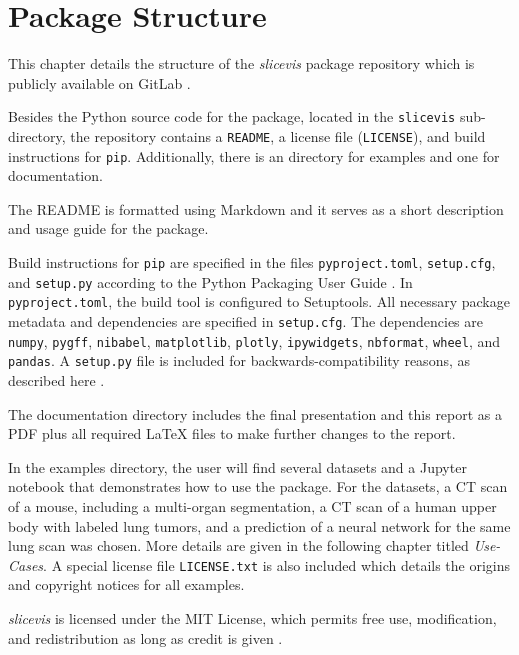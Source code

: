 \chapter{Package Structure}
This chapter details the structure of the \emph{slicevis} package repository which is publicly available on GitLab \cite{repo}.

Besides the Python source code for the package, located in the \texttt{slicevis} sub-directory, the repository contains a \texttt{README}, a license file (\texttt{LICENSE}), and build instructions for \texttt{pip}. Additionally, there is an directory for examples and one for documentation. 

The README is formatted using Markdown and it serves as a short description and usage guide for the package. 

Build instructions for \texttt{pip} are specified in the files \texttt{pyproject.toml}, \texttt{setup.cfg}, and \texttt{setup.py} according to the Python Packaging User Guide \cite{pypa}. In \texttt{pyproject.toml}, the build tool is configured to Setuptools. All necessary package metadata and dependencies are specified in \texttt{setup.cfg}. The dependencies are \texttt{numpy}, \texttt{pygff}, \texttt{nibabel}, \texttt{matplotlib}, \texttt{plotly}, \texttt{ipywidgets}, \texttt{nbformat}, \texttt{wheel}, and \texttt{pandas}. A \texttt{setup.py} file is included for backwards-compatibility reasons, as described here \cite{legacy_config}.

The documentation directory includes the final presentation and this report as a PDF plus all required \LaTeX{} files to make further changes to the report.

In the examples directory, the user will find several datasets and a Jupyter notebook that demonstrates how to use the package. For the datasets,  a CT scan of a mouse, including a multi-organ segmentation, a CT scan of a human upper body with labeled lung tumors, and a prediction of a neural network for the same lung scan was chosen. More details are given in the following chapter titled \emph{Use-Cases}. A special license file \texttt{LICENSE.txt} is also included which details the origins and copyright notices for all examples.

\emph{slicevis} is licensed under the MIT License, which permits free use, modification, and redistribution as long as credit is given \cite{mit}. 